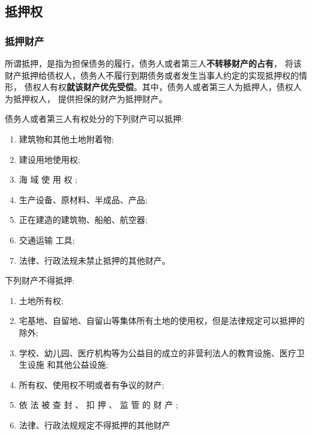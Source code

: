 \documentclass[UTF8,12pt]{ctexart}
\numberwithin{equation}{section} %
\numberwithin{figure}{section}
\numberwithin{table}{section}
\begin{document}
	
	\subsection{抵押权}
	
	\subsubsection{抵押财产}
	所谓抵押，是指为担保债务的履行，债务人或者第三人\textbf{不转移财产的占有}， 将该财产抵押给债权人，债务人不履行到期债务或者发生当事人约定的实现抵押权的情形， 债权人有权\textbf{就该财产优先受偿}。其中，债务人或者第三人为抵押人，债权人为抵押权人， 提供担保的财产为抵押财产。
	
	债务人或者第三人有权处分的下列财产可以抵押: 
	\begin{enumerate}
		\item 建筑物和其他土地附着物;
		
		\item 建设用地使用权;
		
		\item 海 域 使 用 权 ;
		
		\item 生产设备、原材料、半成品、产品;
		
		\item 正在建造的建筑物、船舶、航空器;
		
		\item 交通运输 工具;
		
		\item 法律、行政法规未禁止抵押的其他财产。
	\end{enumerate}
	
	下列财产不得抵押:
	\begin{enumerate}
		\item 土地所有权;
		
		\item 宅基地、自留地、自留山等集体所有土地的使用权，但是法律规定可以抵押的除外; 
		
		\item 学校、幼儿园、医疗机构等为公益目的成立的非营利法人的教育设施、医疗卫生设施 和其他公益设施;
		
		\item 所有权、使用权不明或者有争议的财产;
		 
		\item 依 法 被 查 封 、 扣 押 、 监 管 的 财 产 ;
		
		\item 法律、行政法规规定不得抵押的其他财产
	\end{enumerate}
	
\end{document}
